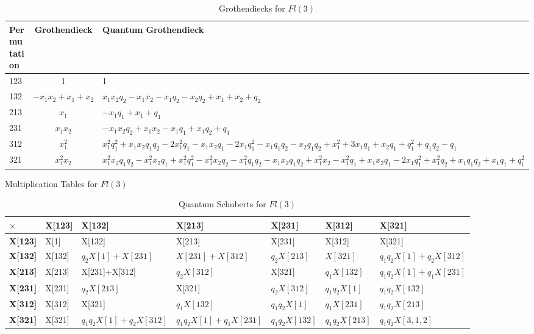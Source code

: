 \documentclass[11pt]{article}
\begin{document}
\begin{table}[!h]
\centering
\caption{Grothendiecks for $Fl(3)$}
\begin{tabular}{|p{2cm}|c|p{10cm}|}
\hline
Permutation &  Grothendieck  &  Quantum Grothendieck  \\ \hline
123 & 1 & 1 \\ \hline
132 & $-x_1x_2 + x_1 + x_2$ & $x_1x_2q_2 - x_1x_2 - x_1q_2 - x_2q_2 + x_1 + x_2 + q_2$ \\ \hline
213 & $x_1$ & $-x_1q_1 + x_1 + q_1$ \\ \hline
231 & $x_1x_2$ & $-x_1x_2q_2 + x_1x_2 - x_1q_1 + x_1q_2 + q_1$ \\ \hline
312 & $x_1^2$ & $
    x_1^2q_1^2 + x_1x_2q_1q_2  - 2x_1^2q_1 - x_1x_2q_1 - 2x_1q_1^2 - x_1q_1q_2 
    - x_2q_1q_2 + x_1^2 + 3x_1q_1 + x_2q_1 + q_1^2 + q_1q_2 - q_1$ \\ \hline 
321 & $x_1^2x_2$ & $x_1^2x_2q_1q_2 - x_1^2x_2q_1 + x_1^2q_1^2 - x_1^2x_2q_2 - x_1^2q_1q_2 - x_1x_2q_1q_2 + x_1^2x_2 - x_1^2q_1 + x_1x_2q_1 - 2x_1q_1^2 + x_1^2q_2 + x_1q_1q_2 + x_1q_1 + q_1^2$ \\ \hline 
\end{tabular}
\end{table}


\newpage

Multiplication Tables for $Fl(3)$
\begin{table}[!h]
\centering
\caption{Quantum Schuberts for $Fl(3)$}
\begin{tabular}{|p{1.2cm}|p{2cm}|p{3cm}|p{2cm}|p{2cm}|p{2cm}|p{2cm}|}
\hline
$\times$ & \textbf{X[123]} & \textbf{X[132]} & \textbf{X[213]} & \textbf{X[231]} & \textbf{X[312]} & \textbf{X[321]} \\ \hline
\textbf{X[123]} & X[1] & X[132] & X[213] & X[231] & X[312] & X[321] \\ \hline 
\textbf{X[132]} & X[132] & $q_2X[1]+X[231]$ & $X[231]+X[312]$ & $q_2X[213]$ & $X[321]$ & $q_1q_2X[1]+q_2X[312]$  \\ \hline
\textbf{X[213]} & X[213] & X[231]+X[312] & $q_2X[312]$ & X[321] & $q_1X[132]$ & $q_1q_2X[1]+q_1X[231]$ \\ \hline 
\textbf{X[231]} & X[231] & $q_2X[213]$ & X[321] & $q_2X[312]$ & $q_1q_2X[1]$ & $q_1q_2X[132]$\\ \hline
\textbf{X[312]} & X[312] & X[321] & $q_1X[132]$ & $q_1q_2X[1]$ & $q_1X[231]$ & $q_1q_2X[213]$ \\ \hline
\textbf{X[321]} & X[321] & $q_1q_2X[1]+q_2X[312]$ & $q_1q_2X[1]+q_1X[231]$ & $q_1q_2X[132]$ & $q_1q_2X[213]$ & $q_1q_2X[3,1,2]$ \\ \hline
\end{tabular}
\end{table}
\end{document}

